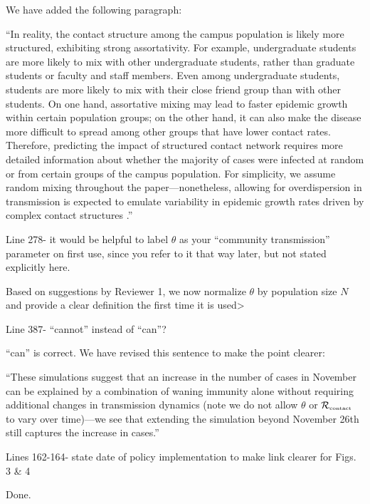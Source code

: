 \documentclass[12pt]{article}
\newcommand{\Rx}[1]{\ensuremath{{\mathcal R}_{#1}}}
\newcommand{\Rc}{\Rx{\textrm{\tiny{contact}}}}
\newcommand{\revtext}{\textsf}
\begin{document}
We have added the following paragraph:

``In reality, the contact structure among the campus population is likely more structured, exhibiting strong assortativity.
For example, undergraduate students are more likely to mix with other undergraduate students, rather than graduate students or faculty and staff members.
Even among undergraduate students, students are more likely to mix with their close friend group than with other students.
On one hand, assortative mixing may lead to faster epidemic growth within certain population groups;
on the other hand, it can also make the disease more difficult to spread among other groups that have lower contact rates.
Therefore, predicting the impact of structured contact network requires more detailed information about whether the majority of cases were infected at random or from certain groups of the campus population.
For simplicity, we assume random mixing throughout the paper---nonetheless, allowing for overdispersion in transmission is expected to emulate variability in epidemic growth rates driven by complex contact structures \citep{lloyd2005superspreading}.''

\revtext{Line 278- it would be helpful to label $\theta$ as your “community transmission” parameter on first use, since you refer to it that way later, but not stated explicitly here.}

Based on suggestions by Reviewer 1, we now normalize $\theta$ by population size $N$ and provide a clear definition the first time it is used>

\revtext{Line 387- “cannot” instead of “can”?}

``can'' is correct. We have revised this sentence to make the point clearer:

``These simulations suggest that an increase in the number of cases in November can be explained by a combination of waning immunity alone without requiring additional changes in transmission dynamics (note we do not allow $\theta$ or $\Rc$ to vary over time)---we see that extending the simulation beyond November 26th still captures the increase in cases.''

\revtext{Lines 162-164- state date of policy implementation to make link clearer for Figs. 3 \& 4} 

Done.

\pagebreak
\end{document}
